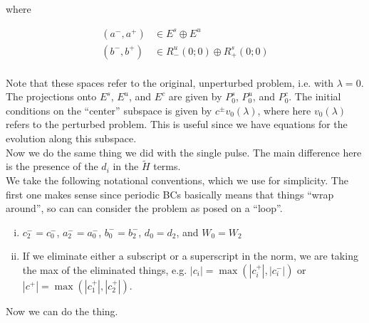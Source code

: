 \documentclass[12pt]{article}
\begin{document}
where

\begin{align*}
(a^-, a^+) &\in E^s \oplus E^u\\
(b^-, b^+) &\in R^u_-(0; 0) \oplus R^s_+(0; 0)\\
\end{align*}

Note that these spaces refer to the original, unperturbed problem, i.e. with $\lambda = 0$. The projections onto $E^s$, $E^u$, and $E^c$ are given by $P_0^s$, $P_0^u$, and $P_0^c$. The initial conditions on the ``center'' subspace is given by $c^\pm v_0(\lambda)$, where here $v_0(\lambda)$ refers to the perturbed problem. This is useful since we have equations for the evolution along this subspace.\\

Now we do the same thing we did with the single pulse. The main difference here is the presence of the $d_i$ in the $\tilde{H}$ terms. \\

We take the following notational conventions, which we use for simplicity. The first one makes sense since periodic BCs basically means that things ``wrap around'', so can can consider the problem as posed on a ``loop''.

\begin{enumerate}[(i)]
\item $c_2^- = c_0^-$, $a_2^- = a_0^-$, $b_0^- = b_2^-$, $d_0 = d_2$, and $W_0 = W_2$
\item If we eliminate either a subscript or a superscript in the norm, we are taking the max of the eliminated things, e.g. $|c_i| = \max(|c_i^+|, |c_i^-|)$ or $|c^+| = \max(|c_1^+|, |c_2^+|)$. 
\end{enumerate}

Now we can do the thing.
\end{document}
